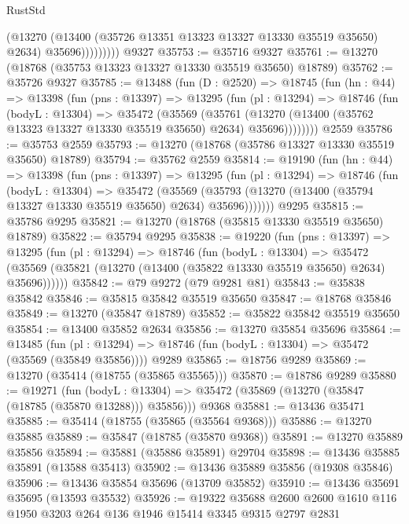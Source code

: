 \begin{lexlean}{RustStd}
\begin{coremodule}
                    (@13270
                      (@13400 (@35726 @13351 @13323 @13327 @13330 @35519 @35650) @2634)
                      @35696)))))))))
    @9327
@35753 := @35716 @9327
@35761 := @13270 (@18768 (@35753 @13323 @13327 @13330 @35519 @35650) @18789)
@35762 := @35726 @9327
@35785 := @13488
    (fun (D : @2520) =>
    @18745
      (fun (hn : @44) =>
      @13398
        (fun (pns : @13397) =>
        @13295
          (fun (pl : @13294) =>
          @18746
            (fun (bodyL : @13304) =>
            @35472
              (@35569
                (@35761
                  (@13270 (@13400 (@35762 @13323 @13327 @13330 @35519 @35650) @2634) @35696))))))))
    @2559
@35786 := @35753 @2559
@35793 := @13270 (@18768 (@35786 @13327 @13330 @35519 @35650) @18789)
@35794 := @35762 @2559
@35814 := @19190
    (fun (hn : @44) =>
    @13398
      (fun (pns : @13397) =>
      @13295
        (fun (pl : @13294) =>
        @18746
          (fun (bodyL : @13304) =>
          @35472
            (@35569
              (@35793 (@13270 (@13400 (@35794 @13327 @13330 @35519 @35650) @2634) @35696)))))))
    @9295
@35815 := @35786 @9295
@35821 := @13270 (@18768 (@35815 @13330 @35519 @35650) @18789)
@35822 := @35794 @9295
@35838 := @19220
    (fun (pns : @13397) =>
    @13295
      (fun (pl : @13294) =>
      @18746
        (fun (bodyL : @13304) =>
        @35472 (@35569 (@35821 (@13270 (@13400 (@35822 @13330 @35519 @35650) @2634) @35696))))))
@35842 := @79 @9272 (@79 @9281 @81)
@35843 := @35838 @35842
@35846 := @35815 @35842 @35519 @35650
@35847 := @18768 @35846
@35849 := @13270 (@35847 @18789)
@35852 := @35822 @35842 @35519 @35650
@35854 := @13400 @35852 @2634
@35856 := @13270 @35854 @35696
@35864 := @13485
    (fun (pl : @13294) => @18746 (fun (bodyL : @13304) => @35472 (@35569 (@35849 @35856))))
    @9289
@35865 := @18756 @9289
@35869 := @13270 (@35414 (@18755 (@35865 @35565)))
@35870 := @18786 @9289
@35880 := @19271
    (fun (bodyL : @13304) => @35472 (@35869 (@13270 (@35847 (@18785 (@35870 @13288))) @35856)))
    @9368
@35881 := @13436 @35471
@35885 := @35414 (@18755 (@35865 (@35564 @9368)))
@35886 := @13270 @35885
@35889 := @35847 (@18785 (@35870 @9368))
@35891 := @13270 @35889 @35856
@35894 := @35881 (@35886 @35891) @29704
@35898 := @13436 @35885 @35891 (@13588 @35413)
@35902 := @13436 @35889 @35856 (@19308 @35846)
@35906 := @13436 @35854 @35696 (@13709 @35852)
@35910 := @13436 @35691 @35695 (@13593 @35532)
@35926 := @19322
    @35688
    @2600
    @2600
    @1610
    @116
    @1950
    @3203
    @264
    @136
    @1946
    @15414
    @3345
    @9315
    @2797
    @2831

\end{coremodule}
\end{lexlean}
